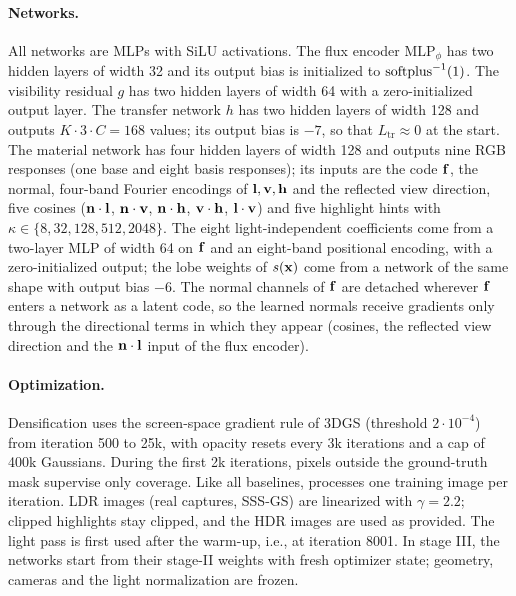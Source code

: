 \documentclass[10pt,twocolumn,letterpaper]{article}
\begin{document}
\paragraph{Networks.}
All networks are MLPs with SiLU activations.
The flux encoder $\mathrm{MLP}_\phi$ has two hidden layers of width 32 and its output bias is initialized to $\operatorname{softplus}^{-1}(1)$.
The visibility residual $g$ has two hidden layers of width 64 with a zero-initialized output layer.
The transfer network $h$ has two hidden layers of width 128 and outputs $K\cdot3\cdot C=168$ values; its output bias is $-7$, so that $L_{\mathrm{tr}}\approx0$ at the start.
The material network has four hidden layers of width 128 and outputs nine RGB responses (one base and eight basis responses); its inputs are the code $\mathbf{f}$, the normal, four-band Fourier encodings of $\mathbf{l},\mathbf{v},\mathbf{h}$ and the reflected view direction, five cosines ($\mathbf{n}\cdot\mathbf{l}$, $\mathbf{n}\cdot\mathbf{v}$, $\mathbf{n}\cdot\mathbf{h}$, $\mathbf{v}\cdot\mathbf{h}$, $\mathbf{l}\cdot\mathbf{v}$) and five highlight hints with $\kappa\in\{8,32,128,512,2048\}$.
The eight light-independent coefficients come from a two-layer MLP of width 64 on $\mathbf{f}$ and an eight-band positional encoding, with a zero-initialized output; the lobe weights of $s(\mathbf{x})$ come from a network of the same shape with output bias $-6$.
The normal channels of $\mathbf{f}$ are detached wherever $\mathbf{f}$ enters a network as a latent code, so the learned normals receive gradients only through the directional terms in which they appear (cosines, the reflected view direction and the $\mathbf{n}\cdot\mathbf{l}$ input of the flux encoder).

\paragraph{Optimization.}
Densification uses the screen-space gradient rule of 3DGS (threshold $2\cdot10^{-4}$) from iteration 500 to 25k, with opacity resets every 3k iterations and a cap of 400k Gaussians.
During the first 2k iterations, pixels outside the ground-truth mask supervise only coverage.
Like all baselines, \ours processes one training image per iteration.
LDR images (real captures, SSS-GS) are linearized with $\gamma=2.2$; clipped highlights stay clipped, and the HDR \gsthree images are used as provided.
The light pass is first used after the warm-up, i.e., at iteration 8001.
In stage III, the networks start from their stage-II weights with fresh optimizer state; geometry, cameras and the light normalization are frozen.
\end{document}
